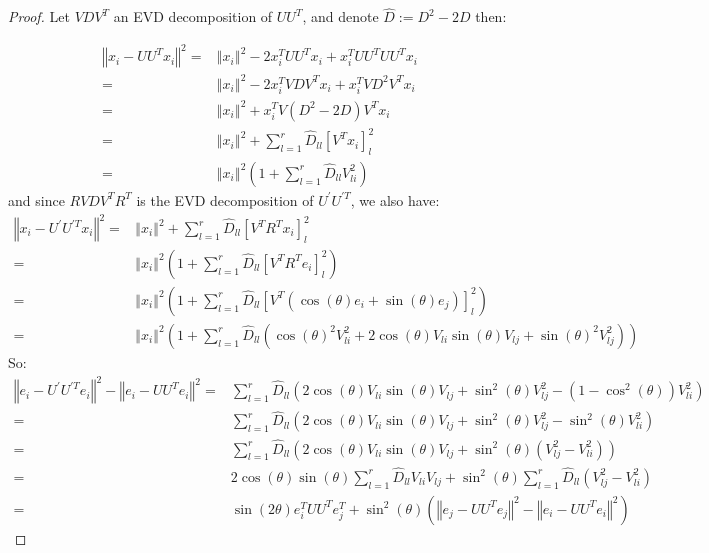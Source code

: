 \documentclass{article}
\begin{document}
\begin{proof}
Let $VDV^{T}$ an EVD decomposition of $UU^{T}$, and denote $\hat{D}:=D^{2}-2D$ then:

\begin{align*}\label{}
    \left\Vert x_{i}-UU^{T}x_{i}\right\Vert ^{2}=&	\left\Vert x_{i}\right\Vert ^{2}-2x_{i}^{T}UU^{T}x_{i}+x_{i}^{T}UU^{T}UU^{T}x_{i}\\
=&	\left\Vert x_{i}\right\Vert ^{2}-2x_{i}^{T}VDV^{T}x_{i}+x_{i}^{T}VD^{2}V^{T}x_{i}\\
=&	\left\Vert x_{i}\right\Vert ^{2}+x_{i}^{T}V\left(D^{2}-2D\right)V^{T}x_{i}\\
=&	\left\Vert x_{i}\right\Vert ^{2}+\sum_{l=1}^{r}\hat{D}_{ll}\left[V^{T}x_{i}\right]_{l}^{2}\\
=&  \left\Vert x_{i}\right\Vert ^{2}\left(1+\sum_{l=1}^{r}\hat{D}_{ll}V_{li}^{2}\right)
\end{align*}
and since $RVDV^{T}R^T$ is the EVD decomposition of $U^{'}U^{'T}$, we also have: 
\begin{align*}
    \left\Vert x_{i}-U^{'}U^{'T}x_{i}\right\Vert^{2}
    =& \left\Vert x_{i}\right\Vert^{2}+\sum_{l=1}^{r}\hat{D}_{ll}\left[V^{T}R^Tx_{i}\right]_{l}^{2}\\
    =& \left\Vert x_{i}\right\Vert^{2}\left(1+\sum_{l=1}^{r}\hat{D}_{ll}\left[V^{T}R^Te_{i}\right]_{l}^{2}\right)\\
    =& \left\Vert x_{i}\right\Vert^{2}\left(1+\sum_{l=1}^{r}\hat{D}_{ll}\left[V^{T}\left(\cos\left(\theta\right)e_{i}+\sin\left(\theta\right)e_{j}\right)\right]_{l}^{2}\right)\\
    =& \left\Vert x_{i}\right\Vert^{2}\left(1+\sum_{l=1}^{r}\hat{D}_{ll}\left(\cos\left(\theta\right)^2V_{li}^{2}+2\cos\left(\theta\right)V_{li}\sin\left(\theta\right)V_{lj}+\sin\left(\theta\right)^{2}V_{lj}^{2}\right)\right)
\end{align*}
So:
\begin{align*}
    \left\Vert e_{i}-U^{'}U^{'T}e_{i}\right\Vert ^{2}-\left\Vert e_{i}-UU^{T}e_{i}\right\Vert^{2}=&\sum_{l=1}^{r}\hat{D}_{ll}\left(2\cos\left(\theta\right)V_{li}\sin\left(\theta\right)V_{lj}+\sin^{2}\left(\theta\right)V_{lj}^{2}-\left(1-\cos^{2}\left(\theta\right)\right)V_{li}^{2}\right)\\
    =& \sum_{l=1}^{r}\hat{D}_{ll}\left(2\cos\left(\theta\right)V_{li}\sin\left(\theta\right)V_{lj}+\sin^{2}\left(\theta\right)V_{lj}^{2}-\sin^{2}\left(\theta\right)V_{li}^{2}\right)\\
    =& \sum_{l=1}^{r}\hat{D}_{ll}\left(2\cos\left(\theta\right)V_{li}\sin\left(\theta\right)V_{lj}+\sin^{2}\left(\theta\right)\left(V_{lj}^{2}-V_{li}^{2}\right)\right)\\
    =& 2\cos\left(\theta\right)\sin\left(\theta\right)\sum_{l=1}^{r}\hat{D}_{ll}V_{li}V_{lj}+\sin^{2}\left(\theta\right)\sum_{l=1}^{r}\hat{D}_{ll}\left(V_{lj}^{2}-V_{li}^{2}\right)\\
    =& \sin\left(2\theta\right)e_{i}^{T}UU^{T}e_{j}^{T}+\sin^{2}\left(\theta\right)\left(\left\Vert e_{j}-UU^{T}e_{j}\right\Vert ^{2}-\left\Vert e_{i}-UU^{T}e_{i}\right\Vert ^{2}\right)
\end{align*}
\end{proof}
\end{document}
